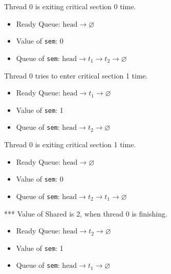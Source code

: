 \documentclass[11pt]{article}
\begin{document}
\begin{question}
    \begin{subquestion}
        Thread 0 is exiting critical section 0 time.

    \begin{itemize}
        \item{
            Ready Queue: $\text{head}\longrightarrow\varnothing$
        } \item{
            Value of {\tt sem}: 0
        } \item{
            Queue of {\tt sem}: $\text{head}\longrightarrow t_{1}\longrightarrow t_{2}\longrightarrow\varnothing$
        }
    \end{itemize}
    \end{subquestion}

    \begin{subquestion}
        Thread 0 tries to enter critical section 1 time.

    \begin{itemize}
        \item{
            Ready Queue: $\text{head}\longrightarrow t_{1}\longrightarrow\varnothing$
        } \item{
            Value of {\tt sem}: 1
        } \item{
            Queue of {\tt sem}: $\text{head}\longrightarrow t_{2}\longrightarrow\varnothing$
        }
    \end{itemize}
    \end{subquestion}

    \begin{subquestion}
        Thread 0 is exiting critical section 1 time.

    \begin{itemize}
        \item{
            Ready Queue: $\text{head}\longrightarrow\varnothing$
        } \item{
            Value of {\tt sem}: 0
        } \item{
            Queue of {\tt sem}: $\text{head}\longrightarrow t_{2}\longrightarrow t_{1}\longrightarrow\varnothing$
        }
    \end{itemize}
    \end{subquestion}

    \begin{subquestion}
        *** Value of Shared is 2, when thread 0 is finishing.

    \begin{itemize}
        \item{
            Ready Queue: $\text{head}\longrightarrow t_{2}\longrightarrow\varnothing$
        } \item{
            Value of {\tt sem}: 1
        } \item{
            Queue of {\tt sem}: $\text{head}\longrightarrow t_{1}\longrightarrow\varnothing$
        }
    \end{itemize}
    \end{subquestion}


\end{question}
\end{document}

